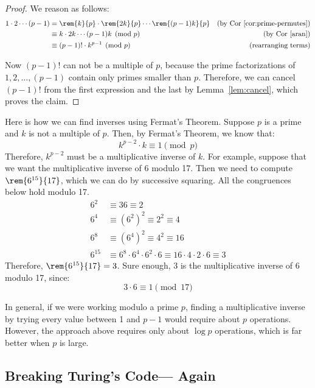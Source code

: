 \begin{proof}
We reason as follows:
\begin{align*}
1 \cdot 2 \cdots (p-1)
	& = \rem{k}{p} \cdot \rem{2k}{p} \cdots
	\rem{(p-1)k}{p} & \text{(by Cor~\ref{cor:prime-permutes})}\\
	& \equiv k \cdot 2k \cdots (p-1) k \pmod{p}
            & \text{(by Cor~\ref{aran})}\\
	& \equiv (p-1)! \cdot k^{p-1} \pmod{p} & \text{(rearranging terms)}\\
\end{align*}

Now $(p - 1)!$ can not be a multiple of $p$, because the prime
factorizations of $1, 2, \dots, (p - 1)$ contain only primes smaller
than $p$.  Therefore, we can cancel $(p - 1)!$ from the first
expression and the last by Lemma~\ref{lem:cancel}, which proves the
claim.
\end{proof}

Here is how we can find inverses using Fermat's Theorem.  Suppose $p$
is a prime and $k$ is not a multiple of $p$.  Then, by Fermat's
Theorem, we know that:
%
\[
k^{p-2} \cdot k \equiv 1 \pmod{p}
\]
%
Therefore, $k^{p-2}$ must be a multiplicative inverse of $k$.  For
example, suppose that we want the multiplicative inverse of 6 modulo
17.  Then we need to compute $\rem{6^{15}}{17}$, which we can do by
successive squaring.  All the congruences below hold modulo 17.
%
\begin{align*}
6^2 & \equiv 36 \equiv 2 \\
6^4 & \equiv (6^2)^2 \equiv 2^2 \equiv 4 \\
6^8 & \equiv (6^4)^2 \equiv 4^2 \equiv 16 \\
6^{15} & \equiv 6^8 \cdot 6^4 \cdot 6^2 \cdot 6
       \equiv 16 \cdot 4 \cdot 2 \cdot 6
       \equiv 3
\end{align*}
%
Therefore, $\rem{6^{15}}{17} = 3$.  Sure enough, 3 is the multiplicative
inverse of 6 modulo 17, since:
%
\[
3 \cdot 6 \equiv 1 \pmod{17}
\]

In general, if we were working modulo a prime $p$, finding a
multiplicative inverse by trying every value between 1 and $p - 1$
would require about $p$ operations.  However, the approach above
requires only about $\log p$ operations, which is far better when $p$
is large.

\subsection{Breaking Turing's Code--- Again}

